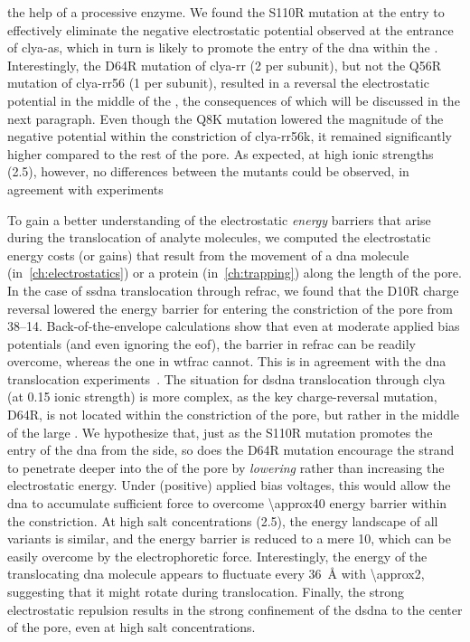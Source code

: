 the help of a processive enzyme. We found the S110R mutation at the \cisi{} entry to effectively eliminate the
negative electrostatic potential observed at the \cisi{} entrance of \gls{clya-as}, which in turn is likely to
promote the entry of the \gls{dna} within the \lumen{}. Interestingly, the D64R mutation of \gls{clya-rr}
(\SI{+2}{\ec} per subunit), but not the Q56R mutation of \gls{clya-rr56} (\SI{+1}{\ec} per subunit), resulted
in a reversal the electrostatic potential in the middle of the \lumen{}, the consequences of which will be
discussed in the next paragraph. Even though the Q8K mutation lowered the magnitude of the negative potential
within the constriction of \gls{clya-rr56k}, it remained significantly higher compared to the rest of the
pore. As expected, at high ionic strengths (\SI{2.5}{\Molar}), however, no differences between the mutants
could be observed, in agreement with experiments~\cite{Franceschini-2013,Franceschini-2016}

To gain a better understanding of the electrostatic \emph{energy} barriers that arise during the translocation
of analyte molecules, we computed the electrostatic energy costs (or gains) that result from the movement of a
\gls{dna} molecule (in~\cref{ch:electrostatics}) or a protein (in~\cref{ch:trapping}) along the length of the
pore. In the case of \gls{ssdna} translocation through \gls{refrac}, we found that the D10R charge reversal
lowered the energy barrier for entering the constriction of the pore from \SIrange{38}{14}{\kbt}.
Back-of-the-envelope calculations show that even at moderate applied bias potentials (and even ignoring the
\gls{eof}), the barrier in \gls{refrac} can be readily overcome, whereas the one in \gls{wtfrac} cannot. This
is in agreement with the \gls{dna} translocation experiments~\cite{Wloka-2016}. The situation for \gls{dsdna}
translocation through \gls{clya} (at \SI{0.15}{\Molar} ionic strength) is more complex, as the key
charge-reversal mutation, D64R, is not located within the constriction of the pore, but rather in the middle
of the large \cisi{} \lumen{}. We hypothesize that, just as the S110R mutation promotes the entry of the
\gls{dna} from the \cisi{} side, so does the D64R mutation encourage the strand to penetrate deeper into the
\lumen{} of the pore by \emph{lowering} rather than increasing the electrostatic energy. Under (positive)
applied bias voltages, this would allow the \gls{dna} to accumulate sufficient force to overcome
\SI{\approx40}{\kbt} energy barrier within the constriction. At high salt concentrations (\SI{2.5}{\Molar}),
the energy landscape of all variants is similar, and the energy barrier is reduced to a mere \SI{10}{\kbt},
which can be easily overcome by the electrophoretic force. Interestingly, the energy of the translocating
\gls{dna} molecule appears to fluctuate every \SI{36}{\angstrom} with \SI{\approx2}{\kbt}, suggesting that it
might rotate during translocation. Finally, the strong electrostatic repulsion results in the strong
confinement of the \gls{dsdna} to the center of the pore, even at high salt concentrations.

